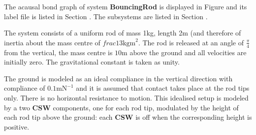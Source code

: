 

The acausal bond graph of system \textbf{BouncingRod} is displayed in
Figure  and its label file is listed in Section
. 
 The subsystems are listed in Section
.

The system consists of a uniform rod of mass 1kg, length 2m (and
therefore of inertia about the mass centre of $frac{1}{3}
\text{kgm}^2$. The rod is released at an angle of $\frac{\pi}{4}$ from
the vertical, the mass centre is $10\text{m}$ above the ground and all
velocities are initially zero. The gravitational constant is taken as unity.

The ground is modeled as an ideal compliance in the vertical
direction with compliance of $0.1 \text{mN}^{-1}$ and it is assumed
that contact takes place at the rod tips only. There is no
horizontal resistance to motion. This idealised setup is modeled by a
two {\bf CSW} components, one for each rod tip, modulated by the
height of each rod tip above the ground: each  {\bf CSW} is off when
the corresponding height is positive.




